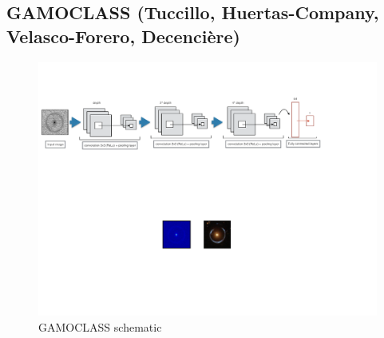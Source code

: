 \documentclass[useAMS,usenatbib]{mnras}
\begin{document}
\subsection{GAMOCLASS (Tuccillo, Huertas-Company, Velasco-Forero, Decenci\`ere)}

\begin{figure}
  \centering
      \includegraphics[width=1\columnwidth]{figures/Fig1_gamoclass.pdf} 
  \caption{GAMOCLASS schematic}
 \label{Fig1_gamoclass}
\end{figure}
\end{document}
